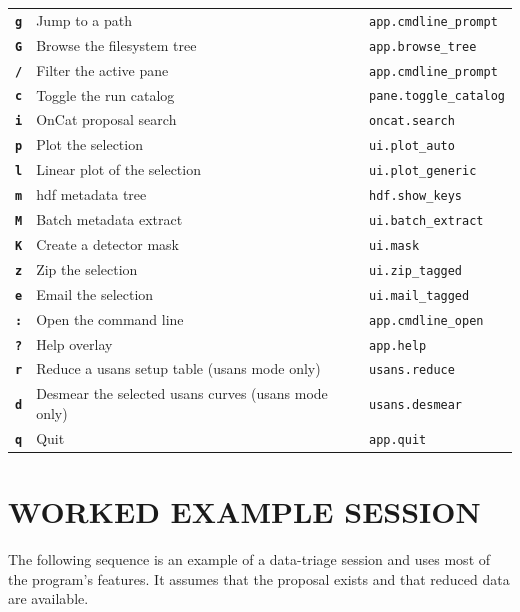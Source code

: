\documentclass[tm]{ornltm}
\newcommand{\key}[1]{\textbf{\texttt{#1}}}
\begin{document}
\begin{small}
\begin{longtable}{p{} p{} p{}}
  \key{g} & Jump to a path & \texttt{app.cmdline\_prompt} \\
  \key{G} & Browse the filesystem tree & \texttt{app.browse\_tree} \\
  \key{/} & Filter the active pane & \texttt{app.cmdline\_prompt} \\
  \key{c} & Toggle the run catalog & \texttt{pane.toggle\_catalog} \\
  \key{i} & OnCat proposal search & \texttt{oncat.search} \\
  \key{p} & Plot the selection & \texttt{ui.plot\_auto} \\
  \key{l} & Linear plot of the selection & \texttt{ui.plot\_generic} \\
  \key{m} & \Ac{hdf} metadata tree & \texttt{hdf.show\_keys} \\
  \key{M} & Batch metadata extract & \texttt{ui.batch\_extract} \\
  \key{K} & Create a detector mask & \texttt{ui.mask} \\
  \key{z} & Zip the selection & \texttt{ui.zip\_tagged} \\
  \key{e} & Email the selection & \texttt{ui.mail\_tagged} \\
  \key{:} & Open the command line & \texttt{app.cmdline\_open} \\
  \key{?} & Help overlay & \texttt{app.help} \\
  \key{r} & Reduce a \ac{usans} setup table (\ac{usans} mode only) &
    \texttt{usans.reduce} \\
  \key{d} & Desmear the selected \ac{usans} curves (\ac{usans} mode only) &
    \texttt{usans.desmear} \\
  \key{q} & Quit & \texttt{app.quit} \\
\end{longtable}
\end{small}

\section{WORKED EXAMPLE SESSION}
\label{sec:appsession}

The following sequence is an example of a data-triage session and uses most of
the program's features. It assumes that the proposal exists and that reduced
data are available.
\end{document}
